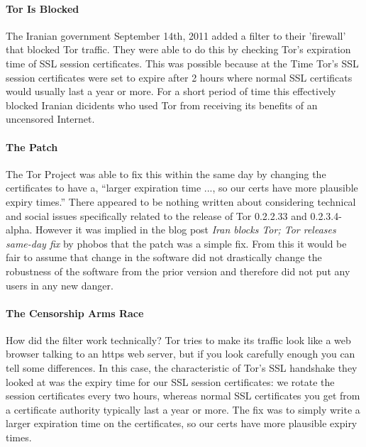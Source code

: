 \documentclass[11pt]{article}
\begin{document}
\begin{multicols}{2}
\paragraph{Tor Is Blocked}

The Iranian government September 14th, 2011 added a filter to their 'firewall'
that blocked Tor traffic. They were able to do this by checking Tor's expiration
time of SSL session certificates. This was possible because at the Time Tor's
SSL session certificates were set to expire after 2 hours where normal SSL
certificats would usually last a year or more. For a short period of time this
effectively blocked Iranian dicidents who used Tor from receiving its benefits
of an uncensored Internet. \cite{IranBlocksTorSameDayFix}

\paragraph{The Patch} 

The Tor Project was able to fix this within the same day by changing the
certificates to have a, ``larger expiration time ..., so our certs have more
plausible expiry times.'' \cite{IranBlocksTorSameDayFix} There appeared to be
nothing written about considering technical and social issues specifically
related to the release of Tor 0.2.2.33 and 0.2.3.4-alpha.  However it was
implied in the blog post \textit{Iran blocks Tor; Tor releases same-day fix} by
phobos that the patch was a simple fix. \cite{IranBlocksTorSameDayFix} From this
it would be fair to assume that change in the software did not drastically
change the robustness of the software from the prior version and therefore did
not put any users in any new danger.

\paragraph{The Censorship Arms Race}

How did the filter work technically? Tor tries to make its traffic look like a
web browser talking to an https web server, but if you look carefully enough you
can tell some differences. In this case, the characteristic of Tor's SSL
handshake they looked at was the expiry time for our SSL session certificates:
we rotate the session certificates every two hours, whereas normal SSL
certificates you get from a certificate authority typically last a year or more.
The fix was to simply write a larger expiration time on the certificates, so our
certs have more plausible expiry times.


\end{multicols}
\end{document}
